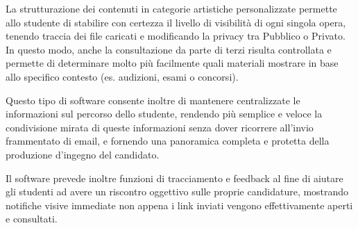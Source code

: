 \documentclass[12pt,a4paper]{article}
\begin{document}
La strutturazione dei contenuti in categorie artistiche personalizzate permette allo studente di stabilire con certezza il livello di visibilità di ogni singola opera, tenendo traccia dei file caricati e modificando la privacy tra Pubblico o Privato. In questo modo, anche la consultazione da parte di terzi risulta controllata e permette di determinare molto più facilmente quali materiali mostrare in base allo specifico contesto (es. audizioni, esami o concorsi).

Questo tipo di software consente inoltre di mantenere centralizzate le informazioni sul percorso dello studente, rendendo più semplice e veloce la condivisione mirata di queste informazioni senza dover ricorrere all'invio frammentato di email, e fornendo una panoramica completa e protetta della produzione d'ingegno del candidato. 

Il software prevede inoltre funzioni di tracciamento e feedback al fine di aiutare gli studenti ad avere un riscontro oggettivo sulle proprie candidature, mostrando notifiche visive immediate non appena i link inviati vengono effettivamente aperti e consultati.
\end{document}
